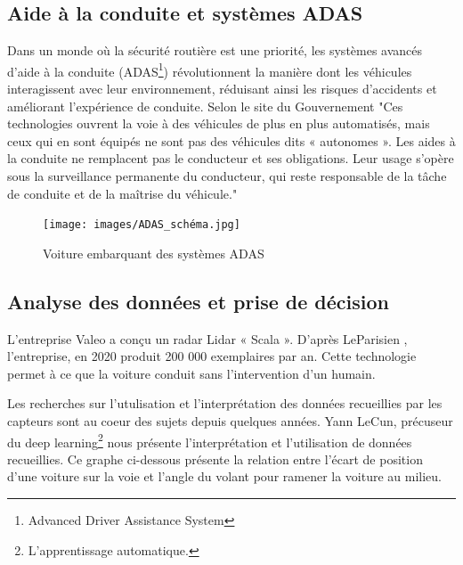 \documentclass{article}
\begin{document}
\subsection{Aide à la conduite et systèmes ADAS}
Dans un monde où la sécurité routière est une priorité, les systèmes avancés d’aide à la conduite (ADAS\footnote{Advanced Driver Assistance System}) révolutionnent la manière dont les véhicules interagissent avec leur environnement, réduisant ainsi les risques d’accidents et améliorant l’expérience de conduite.
Selon le site du Gouvernement \cite{adas_gouv} "Ces technologies ouvrent la voie à des véhicules de plus en plus automatisés, mais ceux qui en sont équipés ne sont pas des véhicules dits « autonomes ». Les aides à la conduite ne remplacent pas le conducteur et ses obligations. Leur usage s’opère sous la surveillance permanente du conducteur, qui reste responsable de la tâche de conduite et de la maîtrise du véhicule."
\begin{figure}[h]
    \centering
    \texttt{[image: images/ADAS\_schéma.jpg]} 
    \caption{Voiture embarquant des systèmes ADAS\cite{continental_adas}}
\end{figure}




\subsection{Analyse des données et prise de décision}
L'entreprise Valeo a conçu un radar Lidar « Scala ». D'après LeParisien \cite{le_parisien_radar_2019}, l'entreprise, en 2020 produit 200 000 exemplaires par an. Cette technologie permet à ce que la voiture conduit sans l'intervention d'un humain.


Les recherches sur l'utulisation et l'interprétation des données recueillies par les capteurs sont au coeur des sujets depuis quelques années. Yann LeCun, précuseur du deep learning\footnote{L'apprentissage automatique.} nous présente l'interprétation et l'utilisation de données recueillies.
Ce graphe ci-dessous présente la relation entre l’écart de position d’une voiture sur la voie et l’angle du volant pour ramener la voiture au milieu. 
\end{document}
